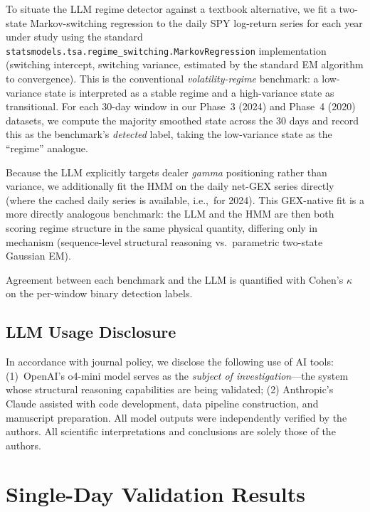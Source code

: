 \documentclass[jrfm,article,accept,moreauthors,pdftex]{Definitions/mdpi}
\begin{document}
To situate the LLM regime detector against a textbook alternative, we fit
a two-state Markov-switching regression
\citep{hamilton1989new,nystrup2020regime} to the daily SPY log-return
series for each year under study using the standard
\texttt{statsmodels.tsa.regime\_}\linebreak \texttt{switching.MarkovRegression}
implementation (switching intercept, switching variance, estimated by
the standard EM algorithm to convergence). This is the conventional
\textit{volatility-regime} benchmark: a low-variance state is interpreted
as a stable regime and a high-variance state as transitional. For each
30-day window in our Phase~3 (2024) and Phase~4 (2020) datasets, we
compute the majority smoothed state across the 30 days and record this
as the benchmark's \emph{detected} label, taking the low-variance state
as the ``regime'' analogue.

Because the LLM explicitly targets dealer \emph{gamma} positioning rather
than variance, we additionally fit the HMM on the daily net-GEX series
directly (where the cached daily series is available, i.e.,\ for 2024).
This GEX-native fit is a more directly analogous benchmark: the LLM and
the HMM are then both scoring regime structure in the same physical
quantity, differing only in mechanism (sequence-level structural
reasoning vs.\ parametric two-state Gaussian EM).

Agreement between each benchmark and the LLM is quantified with Cohen's
$\kappa$ on the per-window binary detection labels.

\subsection{LLM Usage Disclosure}

In accordance with journal policy, we disclose the following use of AI tools: (1)~OpenAI's o4-mini model serves as the \textit{subject of investigation}---the system whose structural reasoning capabilities are being validated; (2) Anthropic's Claude assisted with code development, data pipeline construction, and manuscript preparation. All model outputs were independently verified by the authors. All scientific interpretations and conclusions are solely those of the authors.

\section{Single-Day Validation Results}
\label{sec:single_day}
\end{document}
